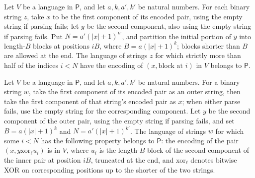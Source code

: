 \begin{theorem}
\label{Complexity.mem_P_of_blockMajority}
\leanok
{}
Let $V$ be a language in $\mathsf{P}$, and let $a,k,a',k'$ be natural numbers. For each
binary string $z$, take $x$ to be the first component of its encoded pair, using the
empty string if parsing fails; let $y$ be the second component, also using the empty
string if parsing fails. Put $N=a'(|x|+1)^{k'}$, and partition the initial portion of
$y$ into length-$B$ blocks at positions $iB$, where $B=a(|x|+1)^k$; blocks shorter than
$B$ are allowed at the end. The language of strings $z$ for which strictly more than
half of the indices $i<N$ have the encoding of $(x,\text{block at }i)$ in $V$ belongs to
$\mathsf{P}$.
\end{theorem}

\begin{theorem}
\label{Complexity.mem_P_of_blockXorAny}
\leanok
{}
Let $V$ be a language in $\mathsf{P}$, and let $a,k,a',k'$ be natural numbers. For a
binary string $w$, take the first component of its encoded pair as an outer string, then
take the first component of that string's encoded pair as $x$; when either parse fails,
use the empty string for the corresponding component. Let $y$ be the second component of
the outer pair, using the empty string if parsing fails, and set $B=a(|x|+1)^k$ and
$N=a'(|x|+1)^{k'}$. The language of strings $w$ for which some $i<N$ has the following
property belongs to $\mathsf{P}$: the encoding of the pair $(x,
y\mathbin{\mathrm{xor}}_\ell u_i)$ is in $V$, where $u_i$ is the length-$B$ block of the
second component of the inner pair at position $iB$, truncated at the end, and
$\mathbin{\mathrm{xor}}_\ell$ denotes bitwise XOR on corresponding positions up to the
shorter of the two strings.
\end{theorem}
